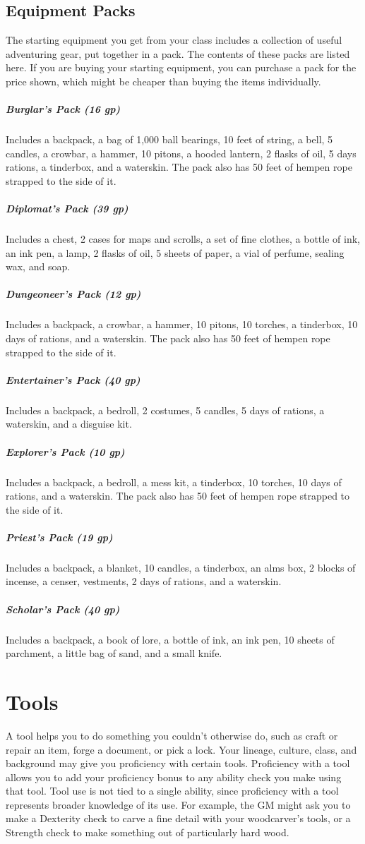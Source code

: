 \subsection{Equipment Packs}

The starting equipment you get from your class includes a collection of useful adventuring gear, put together in a pack. The contents of these packs are listed here. If you are buying your starting equipment, you can purchase a pack for the price shown, which might be cheaper than buying the items individually.

\subparagraph*{Burglar's Pack (16 gp)} Includes a backpack, a bag of 1,000 ball bearings, 10 feet of string, a bell, 5 candles, a crowbar, a hammer, 10 pitons, a hooded lantern, 2 flasks of oil, 5 days rations, a tinderbox, and a waterskin. The pack also has 50 feet of hempen rope strapped to the side of it.

\subparagraph*{Diplomat's Pack (39 gp)} Includes a chest, 2 cases for maps and scrolls, a set of fine clothes, a bottle of ink, an ink pen, a lamp, 2 flasks of oil, 5 sheets of paper, a vial of perfume, sealing wax, and soap.

\subparagraph*{Dungeoneer's Pack (12 gp)} Includes a backpack, a crowbar, a hammer, 10 pitons, 10 torches, a tinderbox, 10 days of rations, and a waterskin. The pack also has 50 feet of hempen rope strapped to the side of it.

\subparagraph*{Entertainer's Pack (40 gp)} Includes a backpack, a bedroll, 2 costumes, 5 candles, 5 days of rations, a waterskin, and a disguise kit.

\subparagraph*{Explorer's Pack (10 gp)} Includes a backpack, a bedroll, a mess kit, a tinderbox, 10 torches, 10 days of rations, and a waterskin. The pack also has 50 feet of hempen rope strapped to the side of it.

\subparagraph*{Priest's Pack (19 gp)} Includes a backpack, a blanket, 10 candles, a tinderbox, an alms box, 2 blocks of incense, a censer, vestments, 2 days of rations, and a waterskin.

\subparagraph*{Scholar's Pack (40 gp)} Includes a backpack, a book of lore, a bottle of ink, an ink pen, 10 sheets of parchment, a little bag of sand, and a small knife.

\section{Tools}

A tool helps you to do something you couldn't otherwise do, such as craft or repair an item, forge a document, or pick a lock. Your lineage, culture, class, and background may give you proficiency with certain tools. Proficiency with a tool allows you to add your proficiency bonus to any ability check you make using that tool. Tool use is not tied to a single ability, since proficiency with a tool represents broader knowledge of its use. For example, the GM might ask you to make a Dexterity check to carve a fine detail with your woodcarver's tools, or a Strength check to make something out of particularly hard wood.

